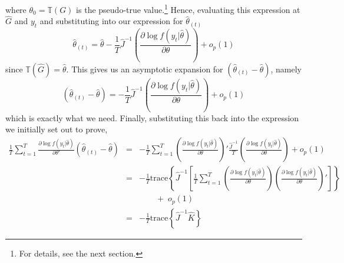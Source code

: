 where $\theta_0 = \mathbb{T}(G)$ is the pseudo-true value.\footnote{For details, see the next section.} Hence, evaluating this expression at $\widehat{G}$ and $y_t$ and substituting into our expression for $\widehat{\theta}_{(t)}$
	$$\widehat{\theta}_{(t)} = \widehat{\theta} - \frac{1}{T}\widehat{J}^{-1} \left(\frac{\partial \log f(y_t|\widehat{\theta})}{\partial \theta}\right) + o_p(1)$$
since $\mathbb{T}(\widehat{G}) = \widehat{\theta}$. This gives us an asymptotic expansion for $\left(\widehat{\theta}_{(t)} - \widehat{\theta}\right)$, namely 
$$\left(\widehat{\theta}_{(t)} - \widehat{\theta}\right) =  - \frac{1}{T}\widehat{J}^{-1} \left(\frac{\partial \log f(y_t|\widehat{\theta})}{\partial \theta}\right) + o_p(1)$$
which is exactly what we need. Finally, substituting this back into the expression we initially set out to prove,
\begin{eqnarray*}
	\frac{1}{T}\sum_{t=1}^T \frac{\partial \log f(y_t|\widehat{\theta})}{\partial \theta'}\left(\widehat{\theta}_{(t)} - \widehat{\theta} \right) &=& -\frac{1}{T}\sum_{t=1}^T \left(\frac{\partial \log f(y_t|\widehat{\theta})}{\partial \theta}\right)' \frac{\widehat{J}^{-1}}{T}\left(\frac{\partial \log f(y_t|\widehat{\theta})}{\partial \theta}\right) + o_p(1)\\
		&=& -\frac{1}{T}\mbox{trace}\left\{\widehat{J}^{-1}\left[\frac{1}{T}\sum_{t=1}^T \left(\frac{\partial \log f(y_t|\widehat{\theta})}{\partial \theta}\right) \left(\frac{\partial \log f(y_t|\widehat{\theta})}{\partial \theta}\right) '\right]\right\}\\
		&&\quad \quad + \; o_p(1)\\
		&=&-\frac{1}{T}\mbox{trace}\left\{\widehat{J}^{-1} \widehat{K} \right\}
\end{eqnarray*}


